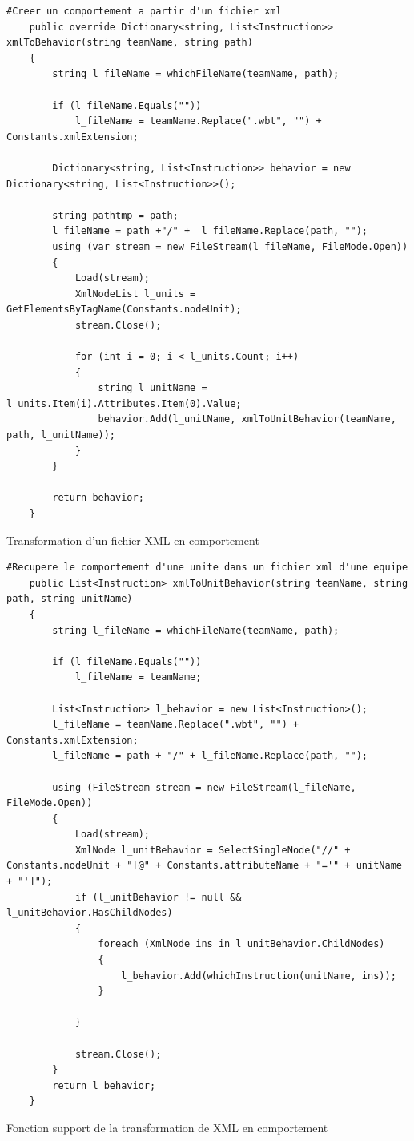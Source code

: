 \documentclass{report}
\begin{document}
\begin{lstlisting}[frame=single]
   #Creer un comportement a partir d'un fichier xml
    public override Dictionary<string, List<Instruction>> xmlToBehavior(string teamName, string path)
    {
        string l_fileName = whichFileName(teamName, path);

        if (l_fileName.Equals(""))
            l_fileName = teamName.Replace(".wbt", "") + Constants.xmlExtension;

        Dictionary<string, List<Instruction>> behavior = new Dictionary<string, List<Instruction>>();

        string pathtmp = path;
        l_fileName = path +"/" +  l_fileName.Replace(path, "");
        using (var stream = new FileStream(l_fileName, FileMode.Open))
        {
            Load(stream);
            XmlNodeList l_units = GetElementsByTagName(Constants.nodeUnit);
            stream.Close();

            for (int i = 0; i < l_units.Count; i++)
            {
                string l_unitName = l_units.Item(i).Attributes.Item(0).Value;
                behavior.Add(l_unitName, xmlToUnitBehavior(teamName, path, l_unitName));
            }
        }

        return behavior;
    }

\end{lstlisting}
 {Transformation d’un fichier XML en comportement}

\begin{lstlisting}[frame=single]
  #Recupere le comportement d'une unite dans un fichier xml d'une equipe
    public List<Instruction> xmlToUnitBehavior(string teamName, string path, string unitName)
    {
        string l_fileName = whichFileName(teamName, path);

        if (l_fileName.Equals(""))
            l_fileName = teamName;

        List<Instruction> l_behavior = new List<Instruction>();
        l_fileName = teamName.Replace(".wbt", "") + Constants.xmlExtension;
        l_fileName = path + "/" + l_fileName.Replace(path, "");

        using (FileStream stream = new FileStream(l_fileName, FileMode.Open))
        {
            Load(stream);
            XmlNode l_unitBehavior = SelectSingleNode("//" + Constants.nodeUnit + "[@" + Constants.attributeName + "='" + unitName + "']");
            if (l_unitBehavior != null && l_unitBehavior.HasChildNodes)
            {
                foreach (XmlNode ins in l_unitBehavior.ChildNodes)
                {
                    l_behavior.Add(whichInstruction(unitName, ins));
                }

            }

            stream.Close();
        }
        return l_behavior;
    }
\end{lstlisting}
 {Fonction support de la transformation de XML en comportement}
\end{document}
